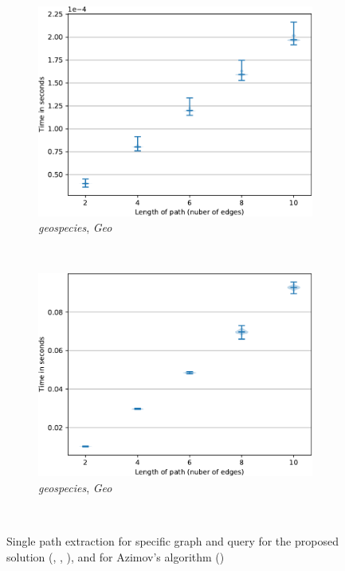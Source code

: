 \begin{figure}
     \begin{subfigure}[b]{0.24\textwidth}
         \centering
         \includegraphics[width=\textwidth]{../paper/data/CF/Matrix_CF/geo_path_matrix.pdf}
         \caption{\footnotesize \textit{geospecies}, \textit{Geo}}
         \label{fig:geo_matrix_cfpq}
     \end{subfigure}
     ~\begin{subfigure}[b]{0.24\textwidth}
         \centering
         \includegraphics[width=\textwidth]{../paper/data/CF/Tensor_path/geo_path_tensor.pdf}
         \caption{\footnotesize \textit{geospecies}, \textit{Geo}}
         \label{fig:geo_tensors_cfpq}
     \end{subfigure}\\
   \caption{Single path extraction for specific graph and query for the proposed solution (, , ), and for Azimov's algorithm ()}
\end{figure}


